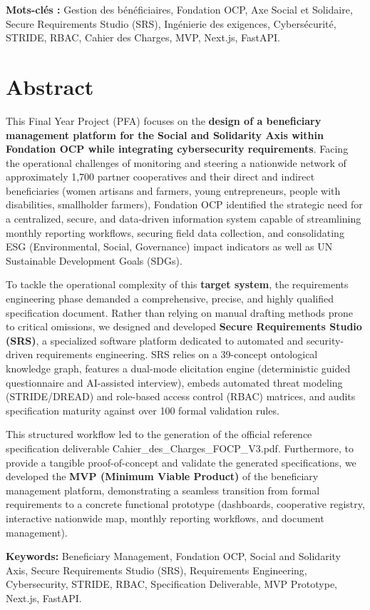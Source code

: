 \vspace{0.8cm}
\noindent\textbf{Mots-clés :} Gestion des bénéficiaires, Fondation OCP, Axe Social et Solidaire, Secure Requirements Studio (SRS), Ingénierie des exigences, Cybersécurité, STRIDE, RBAC, Cahier des Charges, MVP, Next.js, FastAPI.

\vfill
\newpage

\chapter*{Abstract}

This Final Year Project (PFA) focuses on the \textbf{design of a beneficiary management platform for the Social and Solidarity Axis within Fondation OCP while integrating cybersecurity requirements}. Facing the operational challenges of monitoring and steering a nationwide network of approximately 1,700 partner cooperatives and their direct and indirect beneficiaries (women artisans and farmers, young entrepreneurs, people with disabilities, smallholder farmers), Fondation OCP identified the strategic need for a centralized, secure, and data-driven information system capable of streamlining monthly reporting workflows, securing field data collection, and consolidating ESG (Environmental, Social, Governance) impact indicators as well as UN Sustainable Development Goals (SDGs).

To tackle the operational complexity of this \textbf{target system}, the requirements engineering phase demanded a comprehensive, precise, and highly qualified specification document. Rather than relying on manual drafting methods prone to critical omissions, we designed and developed \textbf{Secure Requirements Studio (SRS)}, a specialized software platform dedicated to automated and security-driven requirements engineering. SRS relies on a 39-concept ontological knowledge graph, features a dual-mode elicitation engine (deterministic guided questionnaire and AI-assisted interview), embeds automated threat modeling (STRIDE/DREAD) and role-based access control (RBAC) matrices, and audits specification maturity against over 100 formal validation rules.

This structured workflow led to the generation of the official reference specification deliverable {\ttfamily Cahier\allowbreak\_\allowbreak des\allowbreak\_\allowbreak Charges\allowbreak\_\allowbreak FOCP\allowbreak\_\allowbreak V3.pdf}. Furthermore, to provide a tangible proof-of-concept and validate the generated specifications, we developed the \textbf{MVP (Minimum Viable Product)} of the beneficiary management platform, demonstrating a seamless transition from formal requirements to a concrete functional prototype (dashboards, cooperative registry, interactive nationwide map, monthly reporting workflows, and document management).

\vspace{0.8cm}
\noindent\textbf{Keywords:} Beneficiary Management, Fondation OCP, Social and Solidarity Axis, Secure Requirements Studio (SRS), Requirements Engineering, Cybersecurity, STRIDE, RBAC, Specification Deliverable, MVP Prototype, Next.js, FastAPI.

\vfill
\newpage
